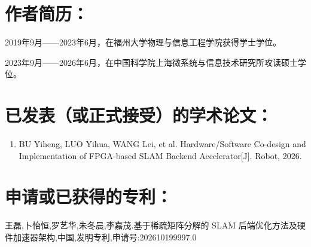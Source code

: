 \section*{作者简历：}
2019年9月——2023年6月，在福州大学物理与信息工程学院获得学士学位。

2023年9月——2026年6月，在中国科学院上海微系统与信息技术研究所攻读硕士学位。


\section*{已发表（或正式接受）的学术论文：}

{
\setlist[enumerate]{}%
\begin{enumerate}[nosep]
    \item BU Yiheng, LUO Yihua, WANG Lei, et al. Hardware/Software Co-design and Implementation of FPGA-based SLAM Backend Accelerator[J]. Robot, 2026.
\end{enumerate}
}

\section*{申请或已获得的专利：}

王磊,卜怡恒,罗艺华,朱冬晨,李嘉茂.基于稀疏矩阵分解的 SLAM 后端优化方法及硬件加速器架构,中国,发明专利,申请号:202610199997.0



\cleardoublepage[plain]%
